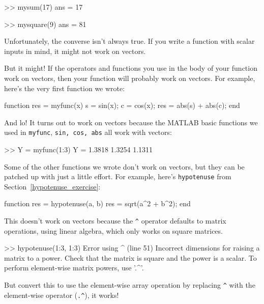 
\begin{code}
>> mysum(17)
ans = 17

>> mysquare(9)
ans = 81
\end{code}

Unfortunately, the converse isn't always true.  If you write
a function with scalar inputs in mind, it might not work on vectors.

But it might!  If the operators and functions
you use in the body of your function work on vectors, then your
function will probably work on vectors.
For example, here's the very first function we wrote:

\begin{code}
function res = myfunc(x)
    s = sin(x);
    c = cos(x);
    res = abs(s) + abs(c);
end
\end{code}

And lo!  It turns out to work on vectors because the MATLAB basic functions we used in \lstinline{myfunc}, \lstinline{sin, cos, abs} all work with vectors:

\begin{code}
>> Y = myfunc(1:3)
Y = 1.3818    1.3254    1.1311
\end{code}

Some of the other functions we wrote don't work on vectors,
but they can be patched up with just a little effort.  For example,
here's \lstinline{hypotenuse} from Section~\ref{hypotenuse_exercise}:

\begin{code}
function res = hypotenuse(a, b)
    res = sqrt(a^2 + b^2);
end
\end{code}

This doesn't work on vectors because the \lstinline{^} operator
defaults to matrix operations, using linear algebra, which only works on
square matrices.


\begin{code}
>> hypotenuse(1:3, 1:3)
Error using  ^  (line 51)
Incorrect dimensions for raising a matrix to a power.
Check that the matrix is square and the power is a scalar.
To perform element-wise matrix powers, use '.^'.
\end{code}

But convert this to use the element-wise array operation by replacing \lstinline{^} with the element-wise operator
(\lstinline{.^}), it works!

